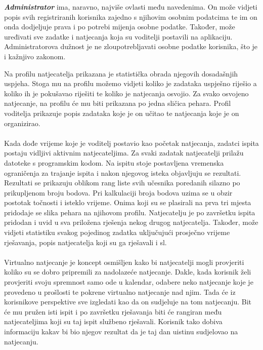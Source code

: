 	    \textbf{\textit{Administrator}} ima, naravno, najviše ovlasti među navedenima. On može vidjeti popis svih registriranih korisnika zajedno s njihovim osobnim podatcima te im on onda dodjeljuje prava i po potrebi mijenja osobne podatke. Također, može uređivati sve zadatke i natjecanja koja su voditelji postavili na aplikaciju. Administratorova dužnost je ne zloupotrebljavati osobne podatke korisnika, što je i kažnjivo zakonom.
	    
	    Na profilu natjecatelja prikazana je statistička obrada njegovih dosadašnjih uspjeha. Stoga mu na profilu možemo vidjeti koliko je zadataka uspješno riješio a koliko ih je pokušavao riješiti te koliko je natjecanja osvojio. Za svako osvojeno natjecanje, na profilu će mu biti prikazana po jedna sličica pehara.
	    Profil voditelja prikazuje popis zadataka koje je on učitao te natjecanja koje je on organizirao. \\
	
		\\
		Kada dođe vrijeme koje je voditelj postavio kao početak natjecanja, zadatci ispita postaju vidljivi aktivnim natjecateljima. Za svaki zadatak natjecatelji prilažu datoteke s programskim kodom. Na ispitu stoje postavljena vremenska ograničenja za trajanje ispita i nakon njegovog isteka objavljuju se rezultati. Rezultati se prikazuju oblikom rang liste svih učesnika poredanih silazno po prikupljenom broju bodova. Pri kalkulaciji broja bodova uzima se u obzir postotak točnosti i isteklo vrijeme. Onima koji su se plasirali na prva tri mjesta pridodaje se slika pehara na njihovom profilu.
		Natjecatelju je po završetku ispita pridodan i uvid u sva priložena rješenja nekog drugog natjecatelja. Također, može vidjeti statistiku svakog pojedinog zadatka uključujući prosječno vrijeme rješavanja, popis natjecatelja koji su ga rješavali i sl.\\
		
		
		\\
		Virtualno natjecanje je koncept osmišljen kako bi natjecatelji mogli provjeriti koliko su se dobro pripremili za nadolazeće natjecanje. Dakle, kada korisnik želi provjeriti svoju spremnost samo ode u kalendar, odabere neko natjecanje koje je provedeno u prošlosti te pokrene virtualno natjecanje nad njim. Tada će iz korisnikove perspektive sve izgledati kao da on sudjeluje na tom natjecanju. Bit će mu pružen isti ispit i po završetku rješavanja biti će rangiran među natjecateljima koji su taj ispit službeno rješavali. Korisnik tako dobiva informaciju kakav bi bio njegov rezultat da je taj dan uistinu sudjelovao na natjecanju.\\
		
